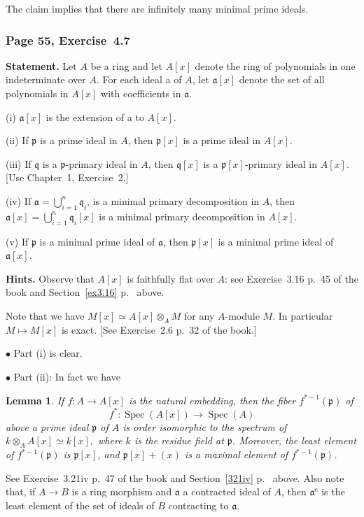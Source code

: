 \documentclass[12pt,letterpaper]{article}%
\newcommand{\oo}{\operatorname}\newcommand{\ooo}{\operatorname*}
\newcommand{\mf}{\mathfrak}
\newcommand{\aaa}{\mf a}
\newcommand{\ppp}{\mf p}
\newcommand{\qqq}{\mf q}
\newcommand{\bu}{\bullet}
\newcommand{\Spec}{\operatorname{Spec}}\newcommand{\Sp}{\operatorname{Spec}}
\newcommand{\nn}{\noindent}
\newtheorem{lem}[thm]{Lemma}
\begin{document}
The claim implies that there are infinitely many minimal prime ideals. 

\subsubsection{Page 55, Exercise~4.7}\label{ex4.7}%

\textbf{Statement.} Let $A$ be a ring and let $A[x]$ denote the ring of polynomials in one indeterminate over $A$. For each ideal a of $A$, let $\aaa[x]$ denote the set of all polynomials in $A[x]$ with coefficients in $\aaa$.

\nn(i) $\aaa[x]$ is the extension of a to $A[x]$.

\nn(ii) If $\ppp$ is a prime ideal in $A$, then $\ppp[x]$ is a prime ideal in $A[x]$.

\nn(iii) If $\qqq$ is a $\ppp$-primary ideal in $A$, then $\qqq[x]$ is a $\ppp[x]$-primary ideal in $A[x]$. [Use Chapter~1, Exercise~2.]

\nn(iv) If $\aaa=\bigcup_{i=1}^n\qqq_i$, is a minimal primary decomposition in $A$, then $\aaa[x]=\bigcup_{i=1}^n\qqq_i[x]$ is a minimal primary decomposition in $A[x]$.

\nn(v) If $\ppp$ is a minimal prime ideal of $\aaa$, then $\ppp[x]$ is a minimal prime ideal of $\aaa[x]$.

\nn\textbf{Hints.} Observe that $A[x]$ is faithfully flat over $A$: see Exercise~3.16 p.~45 of the book and Section~\ref{ex3.16} p.~\pageref{ex3.16} above.

Note that we have $M[x]\simeq A[x]\otimes_AM$ for any $A$-module $M$. In particular $M\mapsto M[x]$ is exact. [See Exercise~2.6 p.~32 of the book.]

\nn$\bu$ Part (i) is clear.

\nn$\bu$ Part (ii): In fact we have 

\begin{lem}\label{fiberx}
If $f:A\to A[x]$ is the natural embedding, then the fiber $f^{*-1}(\ppp)$ of 
$$
f^*:\Spec(A[x])\to\Spec(A)
$$ 
above a prime ideal $\ppp$ of $A$ is order isomorphic to the spectrum of $k\otimes_AA[x]\simeq k[x],$ where $k$ is the residue field at $\ppp$. Moreover, the least element of $f^{*-1}(\ppp)$ is $\ppp[x]$, and $\ppp[x]+(x)$ is a maximal element of $f^{*-1}(\ppp)$.
\end{lem}

See Exercise~3.21iv p.~47 of the book and Section~\ref{321iv} p.~\pageref{321iv} above. Also note that, if $A\to B$ is a ring morphism and $\aaa$ a contracted ideal of $A$, then $\aaa^{\oo e}$ is the least element of the set of ideals of $B$ contracting to $\aaa$.
\end{document}
